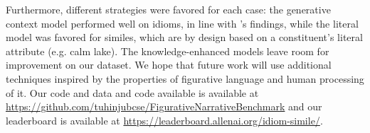 Furthermore, different strategies were favored for each case: the generative context model performed well on idioms, in line with \citeauthor{10.2307/3587719}'s findings, while the literal model was favored for similes, which are by design based on a constituent's literal attribute (e.g. calm lake). The knowledge-enhanced models leave room for improvement on our dataset. We hope that future work will use additional techniques inspired by the properties of figurative language and human processing of it. Our code and data and code available is available at \url{https://github.com/tuhinjubcse/FigurativeNarrativeBenchmark} 
and our leaderboard is available at \url{https://leaderboard.allenai.org/idiom-simile/}.



